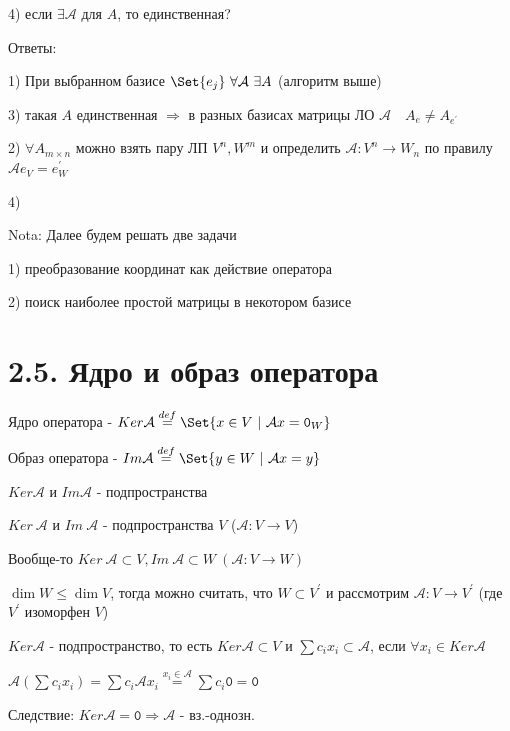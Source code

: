 \documentclass[12pt]{article}
\begin{document}
    4) если $\exists \mathcal{A}$ для $A$, то единственная?

    Ответы:

    1) При выбранном базисе $\Set{e_j} \ \forall \mathcal{A} \ \exists A$ (алгоритм выше)

    3) такая $A$ единственная $\Longrightarrow$ в разных базисах матрицы ЛО $\mathcal{A} \quad A_e \neq A_{e^\prime}$

    2) $\forall A_{m\times n}$ можно взять пару ЛП $V^n, W^m$ и определить $\mathcal{A} : V^n \rightarrow W_n$ по правилу $\mathcal{A}e_V = e_W^\prime$

    4) \Lab

    Nota: Далее будем решать две задачи

    1) преобразование координат как действие оператора

    2) поиск наиболее простой матрицы в некотором базисе

    \section{2.5. Ядро и образ оператора}

    \hypertarget{kernalandimageofoperator}{}

    \Def Ядро оператора - $Ker \mathcal{A} \stackrel{def}{=} \Set{x \in V \ | \ \mathcal{A}x = \texttt{0}_W}$

    \Def Образ оператора - $Im \mathcal{A} \stackrel{def}{=} \Set{y \in W \ | \ \mathcal{A}x = y}$

    \Nota $Ker \mathcal{A}$ и $Im \mathcal{A}$ - подпространства



    \Nota $Ker\ \mathcal{A}$ и $Im\ \mathcal{A}$ - подпространства $V$ ($\mathcal{A} : V \rightarrow V$)

    Вообще-то $Ker\ \mathcal{A} \subset V, Im\ \mathcal{A} \subset W \ (\mathcal{A} : V \rightarrow W)$

    $\dim W \leq \dim V$, тогда можно считать, что $W \subset V^\prime$ и
    рассмотрим $\mathcal{A} : V \rightarrow V^\prime$ (где $V^\prime$ изоморфен $V$)

    $Ker \mathcal{A}$ - подпространство, то есть $Ker \mathcal{A} \subset V$ и
    $\sum c_i x_i \subset \mathcal{A}$, если $\forall x_i \in Ker \mathcal{A}$

    $\mathcal{A} (\sum c_i x_i) = \sum c_i \mathcal{A} x_i \stackrel{x_i \in \mathcal{A}}{=} \sum c_i \texttt{0} = \texttt{0}$

    Следствие: $Ker \mathcal{A} = \texttt{0} \Longrightarrow \mathcal{A}$ - вз.-однозн.
\end{document}
